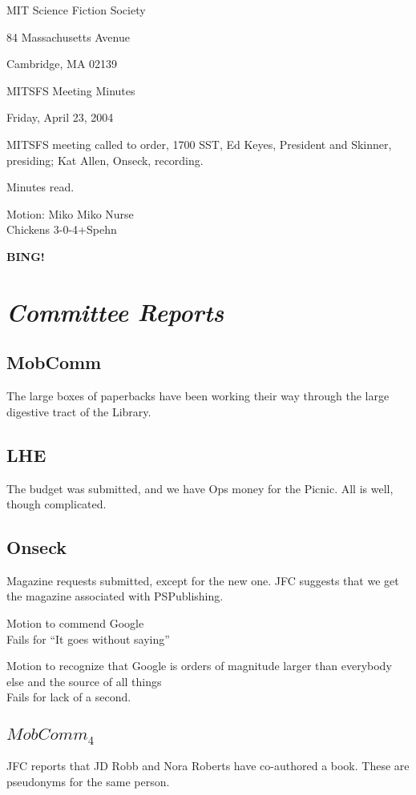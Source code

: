 \documentclass[10pt]{article}
\newcommand{\bing}{{\bf BING!} }
\newcommand{\goto}[1]{\bing \vskip 12pt \section*{{\em{#1}}}}
\begin{document}
\begin{center}

MIT Science Fiction Society 

84 Massachusetts Avenue

Cambridge, MA 02139

\vspace{12pt}

MITSFS Meeting Minutes 

Friday, April 23, 2004


\end{center}
 
\vspace{18pt}

\setlength{\parskip}{6pt}

\noindent
MITSFS meeting called to order, 1700 SST, Ed Keyes, President and
Skinner, presiding; Kat Allen,  Onseck, recording.

Minutes read.

Motion: Miko Miko Nurse\\
Chickens 3-0-4+Spehn

\goto{Committee Reports}
\subsection*{MobComm}
The large boxes of paperbacks have been working their way through the
large digestive tract of the Library. 
\subsection*{LHE}
The budget was submitted, and we have Ops money for the Picnic. All is
well, though complicated.
\subsection*{Onseck}
Magazine requests submitted, except for the new one.
JFC suggests that we get the magazine associated with PSPublishing. 

Motion to commend Google\\
Fails for ``It goes without saying''

Motion to recognize that Google is orders of magnitude larger than
everybody else and the source of all things \\
Fails for lack of a second.

\subsection{$MobComm_4$}
JFC reports that JD Robb and Nora Roberts have co-authored a book.
These are pseudonyms for the same person.  
\end{document}
